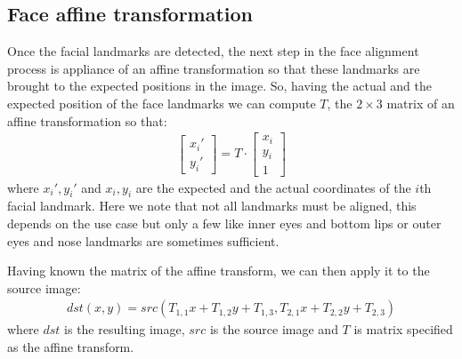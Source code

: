 \subsection{Face affine transformation}
Once the facial landmarks are detected, the next step in the face alignment process is appliance of an affine transformation so that these landmarks are brought to the expected positions in the image. So, having the actual and the expected position of the face landmarks we can compute $T$, the $2\times3$ matrix of an affine transformation so that:
\begin{align}
	\begin{bmatrix}
	x_{i}'\\
	y_{i}'
	\end{bmatrix}
	=
	T \cdot
	\begin{bmatrix}
	x_{i}\\
	y_{i}\\
	1
	\end{bmatrix}
\end{align}
where $x_{i}', y_{i}'$ and $x_{i}, y_{i}$ are the expected and the actual coordinates of the $i$th facial landmark. Here we note that not all landmarks must be aligned, this depends on the use case but only a few like inner eyes and bottom lips or outer eyes and nose landmarks are sometimes sufficient.

Having known the matrix of the affine transform, we can then apply it to the source image:
\begin{align}
	dst(x, y) = src(T_{1,1}x + T_{1,2}y + T_{1,3}, T_{2,1}x + T_{2,2}y + T_{2,3})
\end{align} where $dst$ is the resulting image, $src$ is the source image and $T$ is matrix specified as the affine transform. 